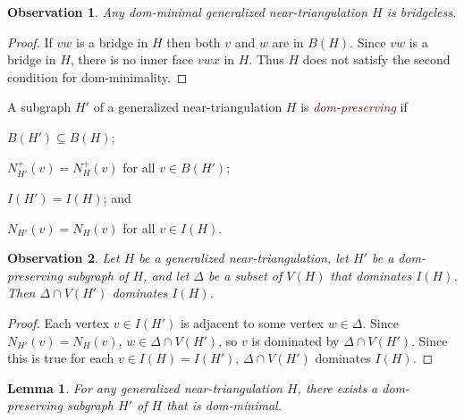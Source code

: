 \documentclass[12pt]{article}
\newtheorem{obs}{Observation}
\newtheorem{lem}{Lemma}
\newcommand{\defin}[1]{\emph{\textcolor{Maroon}{#1}}}
\begin{document}
\begin{obs}\label{bridgeless}
    Any dom-minimal generalized near-triangulation $H$ is bridgeless.
\end{obs}

\begin{proof}
   If $vw$ is a bridge in $H$ then both $v$ and $w$ are in $B(H)$.  Since $vw$ is a bridge in $H$, there is no inner face $vwx$ in $H$. Thus $H$ does not satisfy the second condition for dom-minimality.
\end{proof}

A subgraph $H'$ of a generalized near-triangulation $H$ is \defin{dom-preserving} if
\begin{compactenum}[({DP}1)]
  \item $B(H')\subseteq B(H)$;
  \item $N^+_{H'}(v)=N^+_H(v)$ for all $v\in B(H')$;
  \item $I(H')=I(H)$; and
  \item $N_{H'}(v)=N_H(v)$ for all $v\in I(H)$.
\end{compactenum}

\begin{obs}
  Let $H$ be a generalized near-triangulation, let $H'$ be a dom-preserving subgraph of $H$, and let $\Delta$ be a subset of $V(H)$ that dominates $I(H)$.  Then $\Delta\cap V(H')$ dominates $I(H)$.
\end{obs}

\begin{proof}
  Each vertex $v\in I(H')$ is adjacent to some vertex $w\in \Delta$.  Since $N_{H'}(v)=N_H(v)$, $w\in\Delta\cap V(H')$, so $v$ is dominated by $\Delta\cap V(H')$.  Since this is true for each $v\in I(H)=I(H')$, $\Delta\cap V(H')$ dominates $I(H)$.
\end{proof}

\begin{lem}\label{dom-minimal}
  For any generalized near-triangulation $H$, there exists a dom-preserving subgraph $H'$ of $H$ that is dom-minimal.
\end{lem}
\end{document}
